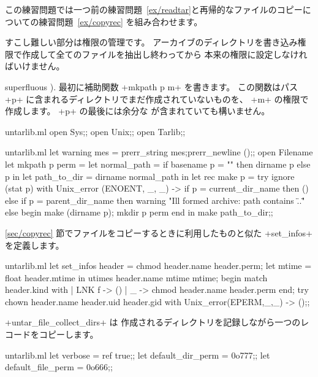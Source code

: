 \begin{answer}
この練習問題では一つ前の練習問題~\ref {ex/readtar}と再帰的なファイルのコピーについての練習問題~\ref {ex/copyrec} を組み合わせます。


すこし難しい部分は権限の管理です。
アーカイブのディレクトリを書き込み権限で作成して全てのファイルを抽出し終わってから
本来の権限に設定しなければいけません。

superfluous \quotes{\ml+/+}).
最初に補助関数 \ml+mkpath p m+ を書きます。
この関数はパス \ml+p+ に含まれるディレクトリでまだ作成されていないものを、 \ml+m+ の権限で作成します。
\ml+p+ の最後には余分な \quotes{\ml+/+} が含まれていても構いません。
%
\begin{codefile}{untarlib.ml}
open Sys;;
open Unix;;
open Tarlib;;
\end{codefile}
%
\begin{listingcodefile}{untarlib.ml}
let warning mes = prerr_string mes;prerr_newline ();;
open Filename
let mkpath p perm =
  let normal_path =
    if basename p = "" then dirname p else p in
  let path_to_dir = dirname normal_path in
  let rec make p =
    try ignore (stat p)
    with Unix_error (ENOENT, _, _) ->
      if p = current_dir_name then ()
      else if p = parent_dir_name then
        warning "Ill formed archive: path contains \"..\""
      else begin
        make (dirname p);
        mkdir p perm
      end in
  make path_to_dir;;
\end{listingcodefile}
%
\ref {sec/copyrec} 節でファイルをコピーするときに利用したものと似た
\ml+set_infos+ を定義します。
%
\begin{listingcodefile}{untarlib.ml}
let set_infos header =
  chmod header.name header.perm;
  let mtime = float header.mtime in
  utimes header.name mtime mtime;
  begin match header.kind with
  | LNK f -> ()
  | _ ->  chmod header.name header.perm
  end;
  try chown header.name  header.uid header.gid
  with Unix_error(EPERM,_,_) -> ();;
\end{listingcodefile}
%
\ml+untar_file_collect_dirs+ は
作成されるディレクトリを記録しながら一つのレコードをコピーします。
%
\begin{listingcodefile}{untarlib.ml}
let verbose = ref true;;
let default_dir_perm = 0o777;;
let default_file_perm = 0o666;;


\end{listingcodefile}
\end{answer}
